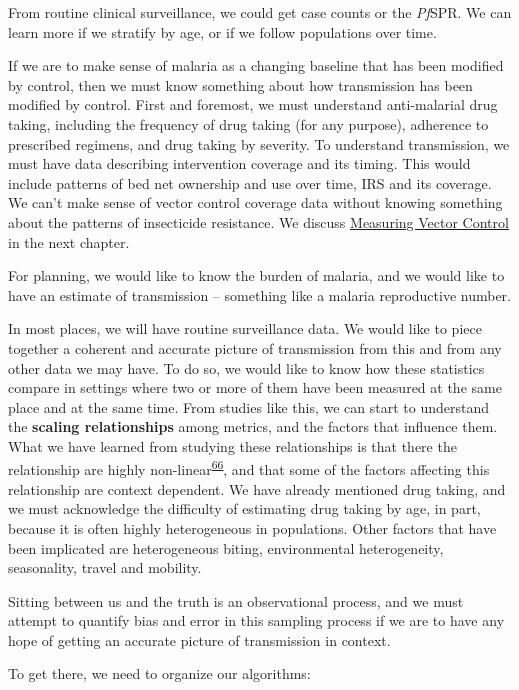 \documentclass[
]{book}
\begin{document}
From routine clinical surveillance, we could get case counts or the \emph{Pf}SPR. We can learn more if we stratify by age, or if we follow populations over time.

If we are to make sense of malaria as a changing baseline that has been modified by control, then we must know something about how transmission has been modified by control. First and foremost, we must understand anti-malarial drug taking, including the frequency of drug taking (for any purpose), adherence to prescribed regimens, and drug taking by severity. To understand transmission, we must have data describing intervention coverage and its timing. This would include patterns of bed net ownership and use over time, IRS and its coverage. We can't make sense of vector control coverage data without knowing something about the patterns of insecticide resistance. We discuss \protect\hyperlink{measuring-vector-control}{Measuring Vector Control} in the next chapter.

For planning, we would like to know the burden of malaria, and we would like to have an estimate of transmission -- something like a malaria reproductive number.

In most places, we will have routine surveillance data. We would like to piece together a coherent and accurate picture of transmission from this and from any other data we may have. To do so, we would like to know how these statistics compare in settings where two or more of them have been measured at the same place and at the same time. From studies like this, we can start to understand the \textbf{scaling relationships} among metrics, and the factors that influence them. What we have learned from studying these relationships is that there the relationship are highly non-linear\textsuperscript{\protect\hyperlink{ref-HaySI2008MeasuringMalaria}{66}}, and that some of the factors affecting this relationship are context dependent. We have already mentioned drug taking, and we must acknowledge the difficulty of estimating drug taking by age, in part, because it is often highly heterogeneous in populations. Other factors that have been implicated are heterogeneous biting, environmental heterogeneity, seasonality, travel and mobility.

Sitting between us and the truth is an observational process, and we must attempt to quantify bias and error in this sampling process if we are to have any hope of getting an accurate picture of transmission in context.

To get there, we need to organize our algorithms:
\end{document}
